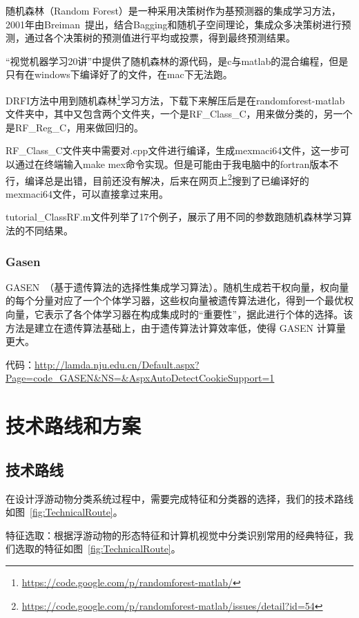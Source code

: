 \documentclass[12pt]{article}
\begin{document}
随机森林（Random Forest）是一种采用决策树作为基预测器的集成学习方法，2001年由Breiman~\cite{breiman2001random}提出，结合Bagging和随机子空间理论，集成众多决策树进行预测，通过各个决策树的预测值进行平均或投票，得到最终预测结果。

“视觉机器学习20讲”中提供了随机森林的源代码，是c与matlab的混合编程，但是只有在windows下编译好了的文件，在mac下无法跑。

DRFI方法中用到随机森林\footnote{\url{https://code.google.com/p/randomforest-matlab/}}学习方法，下载下来解压后是在randomforest-matlab文件夹中，其中又包含两个文件夹，一个是RF\_Class\_C，用来做分类的，另一个是RF\_Reg\_C，用来做回归的。

RF\_Class\_C文件夹中需要对.cpp文件进行编译，生成mexmaci64文件，这一步可以通过在终端输入make mex命令实现。但是可能由于我电脑中的fortran版本不行，编译总是出错，目前还没有解决，后来在网页上\footnote{\url{https://code.google.com/p/randomforest-matlab/issues/detail?id=54}}搜到了已编译好的mexmaci64文件，可以直接拿过来用。

tutorial\_ClassRF.m文件列举了17个例子，展示了用不同的参数跑随机森林学习算法的不同结果。

\subsubsection{Gasen}

GASEN~\cite{zhou2002ensembling}（基于遗传算法的选择性集成学习算法）。随机生成若干权向量，权向量的每个分量对应了一个个体学习器，这些权向量被遗传算法进化，得到一个最优权向量，它表示了各个体学习器在构成集成时的“重要性”，据此进行个体的选择。该方法是建立在遗传算法基础上，由于遗传算法计算效率低，使得 GASEN 计算量更大。

{\color{blue}代码}：\url{http://lamda.nju.edu.cn/Default.aspx?Page=code_GASEN&NS=&AspxAutoDetectCookieSupport=1}

\section{技术路线和方案}

\subsection{技术路线}

在设计浮游动物分类系统过程中，需要完成特征和分类器的选择，我们的技术路线如图~\ref{fig:TechnicalRoute}。

特征选取：根据浮游动物的形态特征和计算机视觉中分类识别常用的经典特征，我们选取的特征如图~\ref{fig:TechnicalRoute}。
\end{document}
